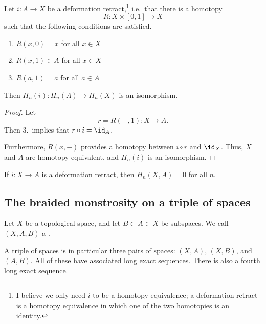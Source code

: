 \documentclass[main.tex]{subfiles}
\begin{document}
\begin{proposition}
  Let $i\colon A \to X$ be a deformation retract,\footnote{I believe we only need $i$ to be a homotopy equivalence; a deformation retract is a homotopy equivalence in which one of the two homotopies is an identity.} i.e.\ that there is a homotopy
  \begin{equation*}
    R\colon X \times [0, 1] \to X
  \end{equation*}
  such that the following conditions are satisfied.
  \begin{enumerate}
    \item $R(x, 0) = x$ for all $x \in X$

    \item $R(x, 1) \in A$ for all $x \in X$

    \item $R(a, 1) = a$ for all $a \in A$
  \end{enumerate}

  Then $H_{n}(i)\colon H_{n}(A) \to H_{n}(X)$ is an isomorphism.
\end{proposition}
\begin{proof}
  Let
  \begin{equation*}
    r = R(-, 1)\colon X \to A.
  \end{equation*}
  Then 3.\ implies that $r \circ i= \id_{A}$.

  Furthermore, $R(x, -)$ provides a homotopy between $i \circ r$ and $\id_{X}$. Thus, $X$ and $A$ are homotopy equivalent, and $H_{n}(i)$ is an isomorphism.
\end{proof}

\begin{corollary}
  If $i\colon X \to A$ is a deformation retract, then $H_{n}(X, A) = 0$ for all $n$.
\end{corollary}

\subsection{The braided monstrosity on a triple of spaces}
\label{ssc:the_braided_monstrosity_on_a_triple_of_spaces}

\begin{definition}
  \label{def:triple_of_spaces}
  Let $X$ be a topological space, and let $B \subset A \subset X$ be subspaces. We call $(X, A, B)$ a .
\end{definition}

A triple of spaces is in particular three pairs of spaces: $(X, A)$, $(X, B)$, and $(A, B)$. All of these have associated long exact sequences. There is also a fourth long exact sequence.
\end{document}
